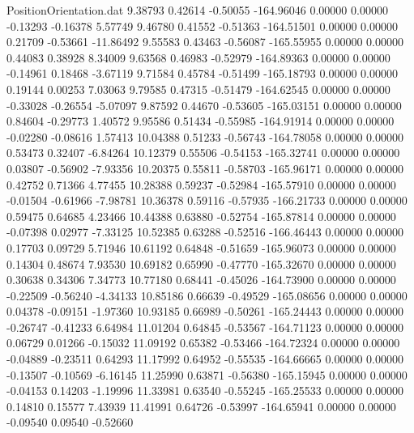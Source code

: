 \begin{filecontents}{PositionOrientation.dat}
   9.38793    0.42614   -0.50055  -164.96046    0.00000    0.00000   -0.13293   -0.16378    5.57749
   9.46780    0.41552   -0.51363  -164.51501    0.00000    0.00000    0.21709   -0.53661  -11.86492
   9.55583    0.43463   -0.56087  -165.55955    0.00000    0.00000    0.44083    0.38928    8.34009
   9.63568    0.46983   -0.52979  -164.89363    0.00000    0.00000   -0.14961    0.18468   -3.67119
   9.71584    0.45784   -0.51499  -165.18793    0.00000    0.00000    0.19144    0.00253    7.03063
   9.79585    0.47315   -0.51479  -164.62545    0.00000    0.00000   -0.33028   -0.26554   -5.07097
   9.87592    0.44670   -0.53605  -165.03151    0.00000    0.00000    0.84604   -0.29773    1.40572
   9.95586    0.51434   -0.55985  -164.91914    0.00000    0.00000   -0.02280   -0.08616    1.57413
  10.04388    0.51233   -0.56743  -164.78058    0.00000    0.00000    0.53473    0.32407   -6.84264
  10.12379    0.55506   -0.54153  -165.32741    0.00000    0.00000    0.03807   -0.56902   -7.93356
  10.20375    0.55811   -0.58703  -165.96171    0.00000    0.00000    0.42752    0.71366    4.77455
  10.28388    0.59237   -0.52984  -165.57910    0.00000    0.00000   -0.01504   -0.61966   -7.98781
  10.36378    0.59116   -0.57935  -166.21733    0.00000    0.00000    0.59475    0.64685    4.23466
  10.44388    0.63880   -0.52754  -165.87814    0.00000    0.00000   -0.07398    0.02977   -7.33125
  10.52385    0.63288   -0.52516  -166.46443    0.00000    0.00000    0.17703    0.09729    5.71946
  10.61192    0.64848   -0.51659  -165.96073    0.00000    0.00000    0.14304    0.48674    7.93530
  10.69182    0.65990   -0.47770  -165.32670    0.00000    0.00000    0.30638    0.34306    7.34773
  10.77180    0.68441   -0.45026  -164.73900    0.00000    0.00000   -0.22509   -0.56240   -4.34133
  10.85186    0.66639   -0.49529  -165.08656    0.00000    0.00000    0.04378   -0.09151   -1.97360
  10.93185    0.66989   -0.50261  -165.24443    0.00000    0.00000   -0.26747   -0.41233    6.64984
  11.01204    0.64845   -0.53567  -164.71123    0.00000    0.00000    0.06729    0.01266   -0.15032
  11.09192    0.65382   -0.53466  -164.72324    0.00000    0.00000   -0.04889   -0.23511    0.64293
  11.17992    0.64952   -0.55535  -164.66665    0.00000    0.00000   -0.13507   -0.10569   -6.16145
  11.25990    0.63871   -0.56380  -165.15945    0.00000    0.00000   -0.04153    0.14203   -1.19996
  11.33981    0.63540   -0.55245  -165.25533    0.00000    0.00000    0.14810    0.15577    7.43939
  11.41991    0.64726   -0.53997  -164.65941    0.00000    0.00000   -0.09540    0.09540   -0.52660

\end{filecontents}
